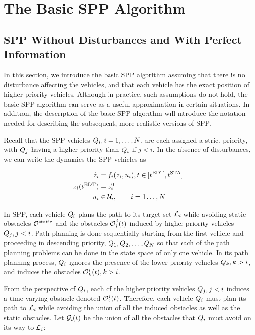 \section{The Basic SPP Algorithm\label{sec:basic}}
\subsection{SPP Without Disturbances and With Perfect Information}
In this section, we introduce the basic SPP algorithm assuming that there is no disturbance affecting the vehicles, and that each vehicle has the exact position of higher-priority vehicles. Although in practice, such assumptions do not hold, the basic SPP algorithm can serve as a useful approximation in certain situations. In addition, the description of the basic SPP algorithm will introduce the notation needed for describing the subsequent, more realistic versions of SPP. 

Recall that the SPP vehicles $Q_{i}, i=1,\ldots,N$, are each assigned a strict priority, with $Q_{j}$ having a higher priority than $Q_{i}$ if $j<i$. In the absence of disturbances, we can write the dynamics the SPP vehicles as

\begin{equation}
\label{eq:basic_dyn}
\begin{aligned}
\dot\state_i &= \fdyn_i(\state_i, \ctrl_i), t \in [\edt, \sta] \\
\state_i(\edt) &= \state^0_i \\
\ctrl_i &\in \cset_i, \qquad i = 1 \ldots, \N
\end{aligned}
\end{equation}

In SPP, each vehicle $Q_{i}$ plans the path to its target set $\mathcal{L}_i$ while avoiding static obstacles $\mathcal{O}^\text{static}$ and the obstacles $\mathcal{O}_i^j(t)$ induced by higher priority vehicles $Q_{j}, j<i$. Path planning is done sequentially starting from the first vehicle and proceeding in descending priority, $Q_{1}, Q_{2}, \ldots, Q_{N}$ so that each of the path planning problems can be done in the state space of only one vehicle. In its path planning process, $Q_{i}$ ignores the presence of the lower priority vehicles $Q_{k}, k>i$, and induces the obstacles $\mathcal{O}_k^i(t), k>i$.

From the perspective of $Q_{i}$, each of the higher priority vehicles $Q_{j}, j<i$ induces a time-varying obstacle denoted $\mathcal{O}_i^j(t)$. Therefore, each vehicle $Q_{i}$ must plan its path to $\mathcal{L}_i$ while avoiding the union of all the induced obstacles as well as the static obstacles. Let $\mathcal{G}_i(t)$ be the union of all the obstacles that $Q_{i}$ must avoid on its way to $\mathcal{L}_i$:

